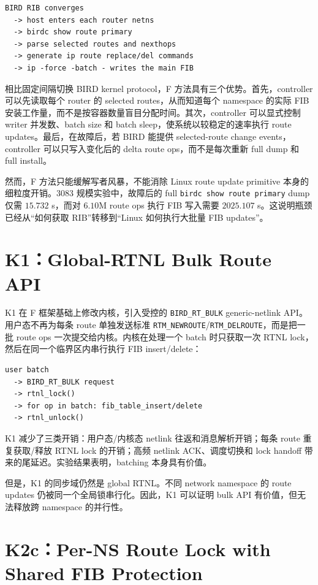 \documentclass[UTF8]{ctexart}
\newcommand{\code}[1]{\texttt{#1}}
\newcommand{\method}[1]{\textsc{#1}}
\begin{document}
\begin{lstlisting}
BIRD RIB converges
  -> host enters each router netns
  -> birdc show route primary
  -> parse selected routes and nexthops
  -> generate ip route replace/del commands
  -> ip -force -batch - writes the main FIB
\end{lstlisting}

相比固定间隔切换 BIRD kernel protocol，\method{F} 方法具有三个优势。首先，controller 可以先读取每个 router 的 selected routes，从而知道每个 namespace 的实际 FIB 安装工作量，而不是按容器数量盲目分配时间。其次，controller 可以显式控制 writer 并发数、batch size 和 batch sleep，使系统以较稳定的速率执行 route updates。最后，在故障后，若 BIRD 能提供 selected-route change events，controller 可以只写入变化后的 delta route ops，而不是每次重新 full dump 和 full install。

然而，\method{F} 方法只能缓解写者风暴，不能消除 Linux route update primitive 本身的细粒度开销。3083 规模实验中，故障后的 full \code{birdc show route primary} dump 仅需 $15.732$ s，而对 $6.10$M route ops 执行 FIB 写入需要 $2025.107$ s。这说明瓶颈已经从``如何获取 RIB''转移到``Linux 如何执行大批量 FIB updates''。

\section{K1：Global-RTNL Bulk Route API}

\method{K1} 在 \method{F} 框架基础上修改内核，引入受控的 \code{BIRD\_RT\_BULK} generic-netlink API。用户态不再为每条 route 单独发送标准 \code{RTM\_NEWROUTE}/\code{RTM\_DELROUTE}，而是把一批 route ops 一次提交给内核。内核在处理一个 batch 时只获取一次 RTNL lock，然后在同一个临界区内串行执行 FIB insert/delete：

\begin{lstlisting}
user batch
  -> BIRD_RT_BULK request
  -> rtnl_lock()
  -> for op in batch: fib_table_insert/delete
  -> rtnl_unlock()
\end{lstlisting}

\method{K1} 减少了三类开销：用户态/内核态 netlink 往返和消息解析开销；每条 route 重复获取/释放 RTNL lock 的开销；高频 netlink ACK、调度切换和 lock handoff 带来的尾延迟。实验结果表明，batching 本身具有价值。

但是，\method{K1} 的同步域仍然是 global RTNL。不同 network namespace 的 route updates 仍被同一个全局锁串行化。因此，\method{K1} 可以证明 bulk API 有价值，但无法释放跨 namespace 的并行性。

\section{K2c：Per-NS Route Lock with Shared FIB Protection}
\end{document}
